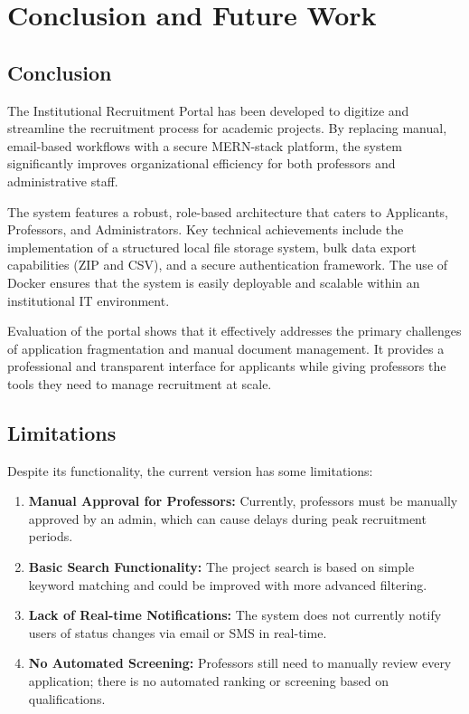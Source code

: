 \chapter{Conclusion and Future Work}

\section{Conclusion}

The Institutional Recruitment Portal has been developed to digitize and streamline the recruitment process for academic projects. By replacing manual, email-based workflows with a secure MERN-stack platform, the system significantly improves organizational efficiency for both professors and administrative staff.

The system features a robust, role-based architecture that caters to Applicants, Professors, and Administrators. Key technical achievements include the implementation of a structured local file storage system, bulk data export capabilities (ZIP and CSV), and a secure authentication framework. The use of Docker ensures that the system is easily deployable and scalable within an institutional IT environment.

Evaluation of the portal shows that it effectively addresses the primary challenges of application fragmentation and manual document management. It provides a professional and transparent interface for applicants while giving professors the tools they need to manage recruitment at scale.

\section{Limitations}

Despite its functionality, the current version has some limitations:

\begin{enumerate}
  \item \textbf{Manual Approval for Professors:} Currently, professors must be manually approved by an admin, which can cause delays during peak recruitment periods.
  
  \item \textbf{Basic Search Functionality:} The project search is based on simple keyword matching and could be improved with more advanced filtering.
  
  \item \textbf{Lack of Real-time Notifications:} The system does not currently notify users of status changes via email or SMS in real-time.
  
  \item \textbf{No Automated Screening:} Professors still need to manually review every application; there is no automated ranking or screening based on qualifications.
\end{enumerate}

